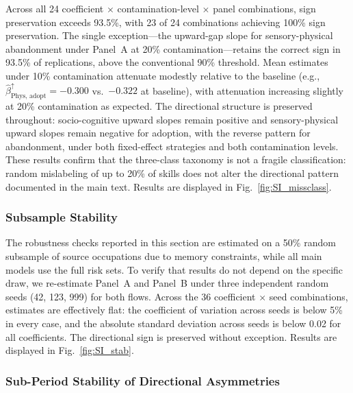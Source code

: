 \documentclass[11pt, letterpaper]{article} %
\begin{document}
Across all 24 coefficient $\times$ contamination-level $\times$ panel combinations, sign preservation exceeds 93.5\%, with 23 of 24 combinations achieving 100\% sign preservation. The single exception---the upward-gap slope for sensory-physical abandonment under Panel~A at 20\% contamination---retains the correct sign in 93.5\% of replications, above the conventional 90\% threshold. Mean estimates under 10\% contamination attenuate modestly relative to the baseline (e.g., $\hat{\beta}^{\uparrow}_{\text{Phys, adopt}} = -0.300$ vs.\ $-0.322$ at baseline), with attenuation increasing slightly at 20\% contamination as expected. The directional structure is preserved throughout: socio-cognitive upward slopes remain positive and sensory-physical upward slopes remain negative for adoption, with the reverse pattern for abandonment, under both fixed-effect strategies and both contamination levels. These results confirm that the three-class taxonomy is not a fragile classification: random mislabeling of up to 20\% of skills does not alter the directional pattern documented in the main text. Results are displayed in Fig.~\ref{fig:SI_missclass}.



\subsubsection{Subsample Stability}
 
The robustness checks reported in this section are estimated on a 50\% random subsample of source occupations due to memory constraints, while all main models use the full risk sets. To verify that results do not depend on the specific draw, we re-estimate Panel~A and Panel~B under three independent random seeds (42, 123, 999) for both flows. Across the 36 coefficient $\times$ seed combinations, estimates are effectively flat: the coefficient of variation across seeds is below 5\% in every case, and the absolute standard deviation across seeds is below 0.02 for all coefficients. The directional sign is preserved without exception. Results are displayed in Fig.~\ref{fig:SI_stab}.
 

 

\subsubsection{Sub-Period Stability of Directional Asymmetries}
\label{sec:SI_subperiod}
\end{document}

